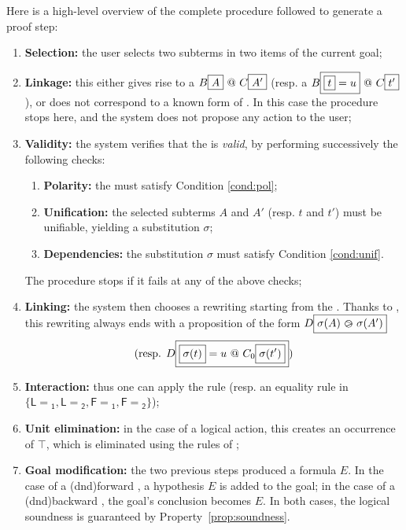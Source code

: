 Here is a high-level overview of the complete procedure followed to generate a
proof step:
\begin{enumerate}
\item \textbf{Selection:} the user selects two subterms in two items of the current goal; \label{step:selection}
\item \textbf{Linkage:} this either gives rise to a  $B\fbox{$A$}
  \operatorname{\,@\,} C\fbox{$A'$}$ (resp. a  $B\fbox{$\fbox{$t$} = u$} \operatorname{\,@\,}
  C\fbox{$t'$}$), or does not correspond to a known form of . In this case
  the procedure stops here, and the system does not propose any action to the
  user; \label{step:linkage}
\item \textbf{Validity:} the system verifies that the  is \emph{valid},
  by performing successively the following checks:
  \begin{enumerate}
    \item \textbf{Polarity:} the  must satisfy Condition \ref{cond:pol};
    \item \textbf{Unification:} the selected subterms $A$ and $A'$ (resp. $t$
    and $t'$) must be unifiable, yielding a substitution $\sigma$;
    \item \textbf{Dependencies:} the substitution $\sigma$ must satisfy
    Condition \ref{cond:unif}.
  \end{enumerate}
  The procedure stops if it fails at any of the above checks;
  \label{step:validity}
\item \textbf{Linking:} the system then chooses a rewriting start\-ing from the
  . Thanks to , this re\-writing always ends with a
  proposition of the form $D\fbox{$\sigma(A) \operatorname{\,\varogreaterthan\,} \sigma(A')$}$ $$\text{(resp.
  $D\fbox{$\fbox{$\sigma(t)$} = u \operatorname{\,@\,} C_0\fbox{$\sigma(t')$}$}$)}$$
  \label{step:linking}
\item \textbf{Interaction:} thus one can apply the {} rule (resp. an equality rule in
$\{\mathsf{L\!\!=\!\!_1}, \mathsf{L\!\!=\!\!_2}, \mathsf{F\!\!=\!\!_1},
\mathsf{F\!\!=\!\!_2}\}$); \label{step:interaction}
\item \textbf{Unit elimination:} in the case of a logical action, this creates an occurrence of $\top$,
which is eliminated using the rules of ; \label{step:unit-elimination}
\item \textbf{Goal modification:} the two previous steps produced a formula $E$.
  In the case of a \kl(dnd){forward} , a hypothesis $E$ is added to the goal; in
  the case of a \kl(dnd){backward} , the goal's conclusion becomes $E$. In both
  cases, the logical soundness is guaranteed by
  Property~\ref{prop:soundness}. \label{step:goal-modification}
\end{enumerate}


